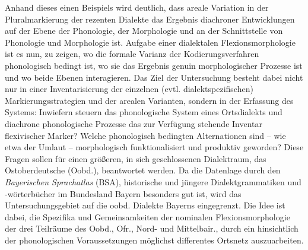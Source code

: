 Anhand dieses einen Beispiels wird deutlich, dass areale Variation in der Pluralmarkierung der rezenten Dialekte das Ergebnis diachroner Entwicklungen auf der Ebene der Phonologie, der Morphologie und an der Schnittstelle von Phonologie und Morphologie ist. Aufgabe einer dialektalen Flexionsmorphologie ist es nun, zu zeigen, wo die formale Varianz der Kodierungsverfahren phonologisch bedingt ist, wo sie das Ergebnis genuin morphologischer Prozesse ist und wo beide Ebenen interagieren. Das Ziel der Untersuchung besteht dabei nicht nur in einer Inventarisierung der einzelnen (evtl. dialektspezifischen) Markierungsstrategien und der arealen Varianten, sondern in der Erfassung des Systems: Inwiefern steuern das phonologische System eines Ortsdialekts und diachrone phonologische Prozesse das zur Verfügung stehende Inventar flexivischer Marker? Welche phonologisch bedingten Alternationen sind -- wie etwa der Umlaut -- morphologisch funktionalisiert und produktiv geworden? Diese Fragen sollen für einen größeren, in sich geschlossenen Dialektraum, das Ostoberdeutsche (Oobd.), beantwortet werden. Da die Datenlage durch den \textit{Bayerischen Sprachatlas} (BSA), his\-to\-ri\-sche und jüngere Dialektgrammatiken und -wörterbücher im Bundesland Bayern besonders gut ist, wird das Untersuchungsgebiet auf die oobd. Dialekte Bayerns eingegrenzt. Die Idee ist dabei, die Spezifika und Gemeinsamkeiten der nominalen Flexionsmorphologie der drei Teilräume des Oobd., Ofr., Nord- und Mittelbair., durch ein hinsichtlich der phonologischen Voraussetzungen möglichst differentes Ortsnetz auszuarbeiten.

